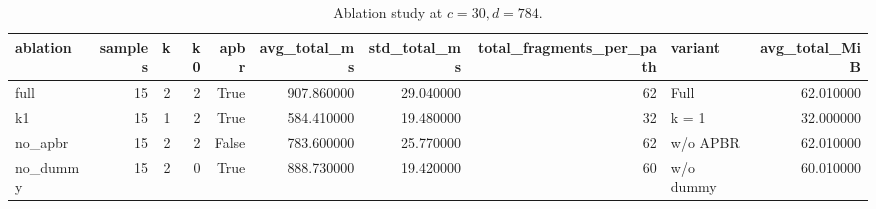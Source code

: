 \begin{table}
\caption{Ablation study at $c=30,d=784$.}
\label{tab:eval-ablation}
\begin{tabular}{lrrrrrrrlr}
\toprule
ablation & samples & k & k0 & apbr & avg_total_ms & std_total_ms & total_fragments_per_path & variant & avg_total_MiB \\
\midrule
full & 15 & 2 & 2 & True & 907.860000 & 29.040000 & 62 & Full & 62.010000 \\
k1 & 15 & 1 & 2 & True & 584.410000 & 19.480000 & 32 & k = 1 & 32.000000 \\
no_apbr & 15 & 2 & 2 & False & 783.600000 & 25.770000 & 62 & w/o APBR & 62.010000 \\
no_dummy & 15 & 2 & 0 & True & 888.730000 & 19.420000 & 60 & w/o dummy & 60.010000 \\
\bottomrule
\end{tabular}
\end{table}
